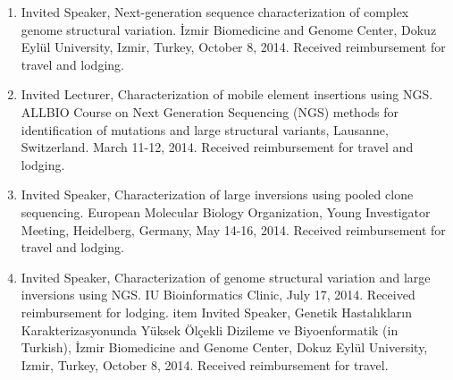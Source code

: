 
\begin{enumerate}
\item Invited Speaker, Next-generation sequence characterization of complex genome structural  variation. İzmir Biomedicine and Genome Center, Dokuz Eylül University, Izmir, Turkey, October 8, 2014. Received reimbursement for travel and lodging.
\item Invited Lecturer, Characterization of mobile element insertions using NGS. ALLBIO Course on Next Generation Sequencing (NGS) methods for identification of mutations and large structural variants, Lausanne, Switzerland. March 11-12, 2014. Received reimbursement for travel and lodging.
\item Invited Speaker, Characterization of large inversions using pooled clone sequencing. European Molecular Biology Organization, Young Investigator Meeting, Heidelberg, Germany, May 14-16, 2014. Received reimbursement for travel and lodging.
\item Invited Speaker, Characterization of genome structural variation and large inversions using NGS. IU Bioinformatics Clinic, July 17, 2014. Received reimbursement for lodging.
item Invited Speaker, Genetik Hastalıkların Karakterizasyonunda Yüksek Ölçekli Dizileme ve Biyoenformatik (in Turkish), İzmir Biomedicine and Genome Center, Dokuz Eylül University, Izmir, Turkey, October 8, 2014. Received reimbursement for travel.

\end{enumerate}

